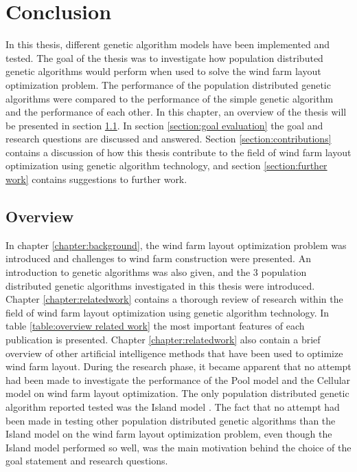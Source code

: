 \chapter{Conclusion}\label{chapter:conclusion}


\noindent In this thesis, different genetic algorithm models have been implemented and tested. The goal of the thesis was to investigate how population distributed genetic algorithms would perform when used to solve the wind farm layout optimization problem. The performance of the population distributed genetic algorithms were compared to the performance of the simple genetic algorithm and the performance of each other. In this chapter, an overview of the thesis will be presented in section \ref{section:overview}. In section \ref{section:goal evaluation} the goal and research questions are discussed and answered. Section \ref{section:contributions} contains a discussion of how this thesis contribute to the field of wind farm layout optimization using genetic algorithm technology, and section \ref{section:further work} contains suggestions to further work.\\


\section{Overview}\label{section:overview}


\noindent In chapter \ref{chapter:background}, the wind farm layout optimization problem was introduced and challenges to wind farm construction were presented. An introduction to genetic algorithms was also given, and the 3 population distributed genetic algorithms investigated in this thesis were introduced.\\


\noindent Chapter \ref{chapter:relatedwork} contains a thorough review of research within the field of wind farm layout optimization using genetic algorithm technology. In table \ref{table:overview related work} the most important features of each publication is presented. Chapter \ref{chapter:relatedwork} also contain a brief overview of other artificial intelligence methods that have been used to optimize wind farm layout. During the research phase, it became apparent that no attempt had been made to investigate the performance of the Pool model and the Cellular model on wind farm layout optimization. The only population distributed genetic algorithm reported tested was the Island model \citep{Grady, Huang, Wan, Sisbot, Gao}. The fact that no attempt had been made in testing other population distributed genetic algorithms than the Island model on the wind farm layout optimization problem, even though the Island model performed so well, was the main motivation behind the choice of the goal statement and research questions.\\ 


